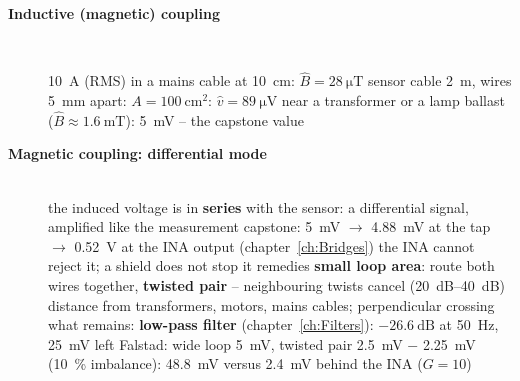 \begin{description}
\item[{\rot\bf Inductive (magnetic) coupling}]~\\[-\lblskip]
\begin{center}
\end{center}
\bi
	\ite \SI{10}{\ampere} (RMS) in a mains cable at \SI{10}{\centi\metre}: $\hat B = \SI{28}{\micro\tesla}$
	\ite sensor cable \SI{2}{\metre}, wires \SI{5}{\milli\metre} apart: $A = \SI{100}{\centi\metre\squared}$: $\hat v = \SI{89}{\micro\volt}$
	\ite near a transformer or a lamp ballast ($\hat B \approx \SI{1.6}{\milli\tesla}$): \SI{5}{\milli\volt} -- the capstone value
\ei
\os{\newpage}

\item[{\rot\bf Magnetic coupling: differential mode}]~\\[-\lblskip]
\bi
	\ite the induced voltage is in \textbf{series} with the sensor: a differential signal, amplified like the measurement
	\itee capstone: \SI{5}{\milli\volt} $\rightarrow$ \SI{4.88}{\milli\volt} at the tap $\rightarrow$ \SI{0.52}{\volt} at the INA output (chapter~\ref{ch:Bridges})
	\ite the INA cannot reject it; a shield does not stop it
	\ite remedies
	\itee \textbf{small loop area}: route both wires together, \textbf{twisted pair} -- neighbouring twists cancel (\SIrange{20}{40}{\deci\bel})
	\itee distance from transformers, motors, mains cables; perpendicular crossing
	\itee what remains: \textbf{low-pass filter} (chapter~\ref{ch:Filters}): $-\SI{26.6}{\deci\bel}$ at \SI{50}{\hertz}, \SI{25}{\milli\volt} left
	\ite Falstad: wide loop \SI{5}{\milli\volt}, twisted pair \SI{2.5}{\milli\volt} $-$ \SI{2.25}{\milli\volt} (\SI{10}{\percent} imbalance): \SI{48.8}{\milli\volt} versus \SI{2.4}{\milli\volt} behind the INA ($G = 10$)
\ei
{}\quad{}\par
\os{\newpage}


\end{description}
